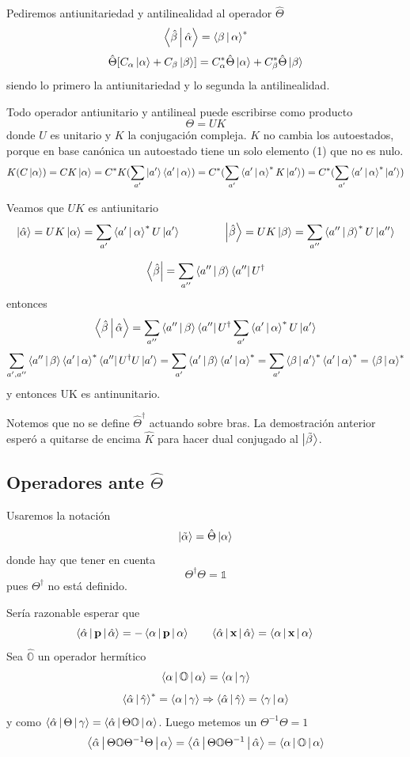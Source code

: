 \documentclass[10pt,oneside]{CBFT_book}
\begin{document}
Pediremos antiunitariedad y antilinealidad al operador $\hat{\Theta}$
\[
	\Braket{\hat{\beta}|\hat{\alpha}} = \Braket{{\beta}|{\alpha}}^*
\]
\[
	\hat{\Theta}[ C_\alpha\Ket{\alpha} + C_\beta\Ket{\beta}] = 
	C_\alpha^*\hat{\Theta}\Ket{\alpha} + C_\beta^*\hat{\Theta}\Ket{\beta}
\]
siendo lo primero la antiunitariedad y lo segunda la antilinealidad.

Todo operador antiunitario y antilineal puede escribirse como producto 
\[
	\Theta = U K
\]
donde $U$ es unitario y $K$ la conjugación compleja. $K$ no cambia los autoestados, porque en base canónica 
un autoestado tiene un solo elemento (1) que no es nulo.
\[
	K(C\Ket{\alpha}) = CK\Ket{\alpha} = C^*K(\sum_{a'} \Ket{a'}\Braket{a'|\alpha}) =
	C^* (\sum_{a'} \Braket{a'|\alpha}^* K \Ket{a'}) =
	C^* (\sum_{a'} \Braket{a'|\alpha}^* \Ket{a'}) 
\]

Veamos que $UK$ es antiunitario 
\[
	\Ket{\hat{\alpha}} = UK \Ket{\alpha} = \sum_{a'} \Braket{a'|\alpha}^* U\Ket{a'} \qquad \qquad
	\Ket{\hat{\beta}} = UK \Ket{\beta} = \sum_{a''} \Braket{a''|\beta}^* U\Ket{a''}
\]

\[
	\Bra{\hat{\beta}} = \sum_{a''} \Braket{a''|\beta} \Bra{a''}U^\dagger
\]
entonces
\[
	\Braket{\hat{\beta}|\hat{\alpha}} = \sum_{a''} \Braket{a''|\beta} \Bra{a''}U^\dagger
	\sum_{a'} \Braket{a'|\alpha}^* U\Ket{a'}
\]
\[
	\sum_{a',a''} \Braket{a''|\beta} \Braket{a'|\alpha}^* \Bra{a''}U^\dagger U\Ket{a'} =
	\sum_{a'} \Braket{a'|\beta} \Braket{a'|\alpha}^* =  \sum_{a'} \Braket{\beta|a'}^* \Braket{a'|\alpha}^*
	= \Braket{\beta|\alpha}^*
\]
y entonces UK es antinunitario.

Notemos que no se define $\hat{\Theta}^\dagger$ actuando sobre bras. La demostración anterior esperó a 
quitarse de encima $\hat{K}$ para hacer dual conjugado al $\Ket{\tilde{\beta}}$.

\subsection{Operadores ante $\hat{\Theta}$}

Usaremos la notación 
\[
	\Ket{\tilde{\alpha}} = \hat{\Theta} \Ket{\alpha}
\]
donde hay que tener en cuenta 
\[
	\Theta^\dagger \Theta = \mathbb{1}
\]
pues $\Theta^\dagger$ no está definido.

Sería razonable esperar que 
\[
	\Braket{\hat{\alpha}|\vb{p}|\hat{\alpha}} = - \Braket{{\alpha}|\vb{p}|{\alpha}}\qquad 
	\Braket{\hat{\alpha}|\vb{x}|\hat{\alpha}} = \Braket{{\alpha}|\vb{x}|{\alpha}}\qquad 
\]
Sea $\hat{\mathbb{O}}$ un operador hermítico 
\[
	\Braket{\alpha|\mathbb{O}|\alpha} = \Braket{\alpha|\gamma}
\]
\[
	\Braket{\hat{\alpha}|\hat{\gamma}}^* = \Braket{\alpha|\gamma} \Rightarrow 
	\Braket{\hat{\alpha}|\hat{\gamma}} = \Braket{\gamma|\alpha}
\]
y como $\Braket{\hat{\alpha}|\Theta|\gamma} = \Braket{\hat{\alpha}|\Theta\mathbb{O}|\alpha}$.
Luego metemos un $\Theta^{-1}\Theta = 1$
\[
	\Braket{\hat{\alpha}|\Theta\mathbb{O}\Theta^{-1}\Theta|\alpha} =
	\Braket{\hat{\alpha}|\Theta\mathbb{O}\Theta^{-1}|\hat{\alpha}} = \Braket{\alpha|\mathbb{O}|\alpha}
\]
\end{document}
